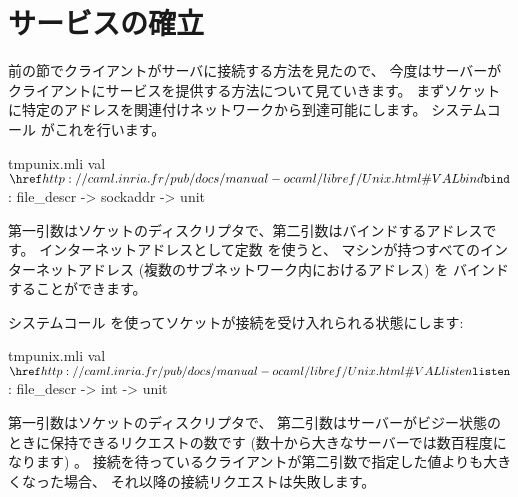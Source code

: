 \section{\label{sec/service}サービスの確立}

前の節でクライアントがサーバに接続する方法を見たので、
今度はサーバーがクライアントにサービスを提供する方法について見ていきます。
まずソケットに特定のアドレスを関連付けネットワークから到達可能にします。
システムコール  がこれを行います。
%
\begin{listingcodefile}{tmpunix.mli}
val $\libvalue{Unix}{bind}$ : file_descr -> sockaddr -> unit
\end{listingcodefile}
%
第一引数はソケットのディスクリプタで、第二引数はバインドするアドレスです。
インターネットアドレスとして定数  を使うと、
マシンが持つすべてのインターネットアドレス (複数のサブネットワーク内におけるアドレス) を
バインドすることができます。

システムコール  を使ってソケットが接続を受け入れられる状態にします:
%
\begin{listingcodefile}{tmpunix.mli}
val $\libvalue{Unix}{listen}$ : file_descr -> int -> unit
\end{listingcodefile}
%
第一引数はソケットのディスクリプタで、
第二引数はサーバーがビジー状態のときに保持できるリクエストの数です
(数十から大きなサーバーでは数百程度になります) 。
接続を待っているクライアントが第二引数で指定した値よりも大きくなった場合、
それ以降の接続リクエストは失敗します。

